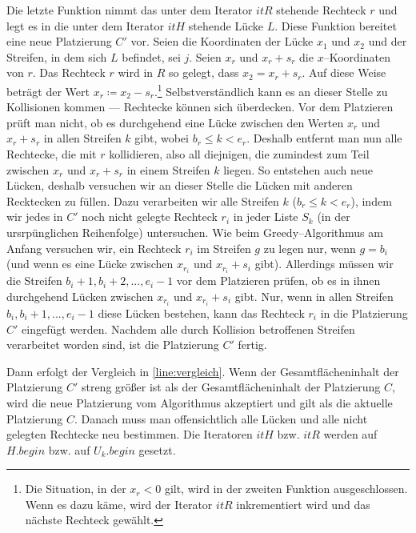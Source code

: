 Die letzte Funktion nimmt das unter dem Iterator $itR$ stehende Rechteck $r$
und legt es in die unter dem Iterator $itH$ stehende Lücke $L$.
Diese Funktion bereitet eine neue Platzierung $C'$ vor.
Seien die Koordinaten der Lücke $x_1$ und $x_2$ und der Streifen, in dem sich $L$ befindet, sei $j$. 
Seien $x_r$ und $x_r + s_r$ die $x$--Koordinaten von $r$.
Das Rechteck $r$ wird in $R$ so gelegt, dass $x_2 = x_r + s_r$. Auf diese Weise beträgt
der Wert $x_r \coloneqq x_2 - s_r$.\footnote{Die Situation, in der $x_r < 0$ gilt, wird  in der
zweiten Funktion ausgeschlossen. Wenn es dazu käme, wird der Iterator $itR$ inkrementiert wird und das nächste Rechteck gewählt.}
Selbstverständlich kann es an dieser Stelle zu Kollisionen kommen --- Rechtecke können sich überdecken.
Vor dem Platzieren prüft man nicht, ob es durchgehend eine Lücke zwischen den Werten $x_r$ und $x_r + s_r$ 
in allen Streifen $k$ gibt, wobei $b_r \leqslant k < e_r$.
Deshalb entfernt man nun alle Rechtecke, die mit $r$ kollidieren, also all diejnigen, die 
zumindest zum Teil zwischen $x_r$ und $x_r + s_r$ in einem Streifen $k$ liegen.
So entstehen auch neue Lücken, deshalb versuchen wir an dieser Stelle 
die Lücken mit anderen Recktecken zu füllen.
Dazu verarbeiten wir alle Streifen $k$ ($b_r \leqslant k < e_r$), indem wir
jedes in $C'$ noch nicht gelegte Rechteck $r_i$
in jeder Liste $S_k$ (in der ursrpünglichen Reihenfolge) untersuchen.
Wie beim Greedy--Algorithmus am Anfang versuchen wir, ein Rechteck
$r_i$ im Streifen $g$ zu legen nur, wenn $g = b_i$
(und wenn es eine Lücke zwischen $x_{r_i}$ und $x_{r_i} + s_i$ gibt).
Allerdings müssen wir die Streifen $b_i+1, b_i+2, ..., e_i-1$ vor dem Platzieren prüfen,
ob es in ihnen durchgehend Lücken zwischen $x_{r_i}$ und $x_{r_i} + s_i$ gibt. 
Nur, wenn in allen Streifen $b_i, b_i + 1, ..., e_i-1$ diese Lücken bestehen,
kann das Rechteck $r_i$ in die Platzierung $C'$ eingefügt werden. 
Nachdem alle durch Kollision betroffenen Streifen verarbeitet worden sind,
ist die Platzierung $C'$ fertig.

Dann erfolgt der Vergleich in \cref{line:vergleich}.
Wenn der Gesamtflächeninhalt der Platzierung $C'$ streng größer ist als
der Gesamtflächeninhalt der Platzierung $C$, wird die neue Platzierung vom Algorithmus
akzeptiert und gilt als die aktuelle Platzierung $C$.
Danach muss man offensichtlich alle Lücken und alle nicht gelegten Rechtecke neu bestimmen.
Die Iteratoren $itH$ bzw. $itR$ werden auf $H.begin$ bzw. auf $U_k.begin$ gesetzt. 

